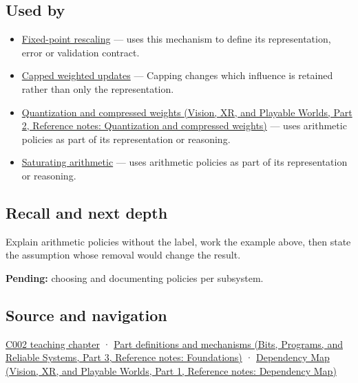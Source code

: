 \subsection{Used by}\label{appendix-2ed044358b82-used-by}

\hypertarget{appendix-2ed044358b82-used-by}{}

\begin{itemize}
\item
  \hyperref[appendix-3333db47830f]{Fixed-point rescaling} --- uses this mechanism to define its representation, error or validation contract.
\item
  \hyperref[appendix-1e45d0613db3]{Capped weighted updates} --- Capping changes which influence is retained rather than only the representation.
\item
  \href{../07-Vision-XR-and-Playable-Worlds-P02/main.pdf\#nameddest=appendix-fdc7879e8bf2}{Quantization and compressed weights (Vision, XR, and Playable Worlds, Part 2, Reference notes: Quantization and compressed weights)} --- uses arithmetic policies as part of its representation or reasoning.
\item
  \hyperref[appendix-3999c6209649]{Saturating arithmetic} --- uses arithmetic policies as part of its representation or reasoning.
\end{itemize}

\subsection{Recall and next depth}\label{appendix-2ed044358b82-recall-and-next-depth}

\hypertarget{appendix-2ed044358b82-recall-and-next-depth}{}

Explain arithmetic policies without the label, work the example above, then state the assumption whose removal would change the result.

\textbf{Pending:} choosing and documenting policies per subsystem.

\subsection{Source and navigation}\label{appendix-2ed044358b82-source-and-navigation}

\hypertarget{appendix-2ed044358b82-source-and-navigation}{}

\hyperref[01-foundations-i-ch001-arithmetic-becomes-a-policy]{C002 teaching chapter} · \href{../01-Bits-Programs-and-Reliable-Systems-P03/main.pdf\#nameddest=appendix-fd090d982a15}{Part definitions and mechanisms (Bits, Programs, and Reliable Systems, Part 3, Reference notes: Foundations)} · \href{../07-Vision-XR-and-Playable-Worlds-P01/main.pdf\#nameddest=appendix-4ad47bdd269a}{Dependency Map (Vision, XR, and Playable Worlds, Part 1, Reference notes: Dependency Map)}
